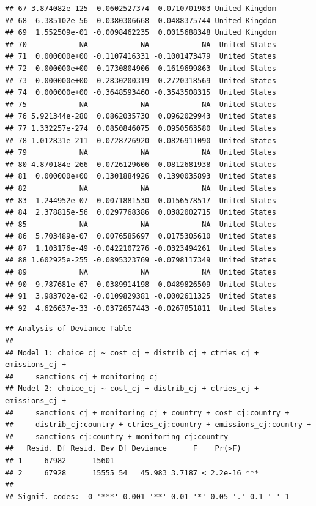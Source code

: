 \documentclass[a4paper,12pt]{article}\usepackage[]{graphicx}\usepackage[]{color}
\makeatletter
\newenvironment{kframe}{%
 \def\at@end@of@kframe{}%
 \ifinner\ifhmode%
  \def\at@end@of@kframe{\end{minipage}}%
  \begin{minipage}{\columnwidth}%
 \fi\fi%
 \def\FrameCommand##1{\hskip\@totalleftmargin \hskip-\fboxsep
 \colorbox{shadecolor}{##1}\hskip-\fboxsep
     \hskip-\linewidth \hskip-\@totalleftmargin \hskip\columnwidth}%
 \MakeFramed {\advance\hsize-\width
   \@totalleftmargin\z@ \linewidth\hsize
   \@setminipage}}%
 {\par\unskip\endMakeFramed%
 \at@end@of@kframe}
\newenvironment{knitrout}{}{} %
\makeatother
\begin{document}
\begin{knitrout}
\begin{kframe}
\begin{verbatim}
## 67 3.874082e-125  0.0602527374  0.0710701983 United Kingdom
## 68  6.385102e-56  0.0380306668  0.0488375744 United Kingdom
## 69  1.552509e-01 -0.0098462235  0.0015688348 United Kingdom
## 70            NA            NA            NA  United States
## 71  0.000000e+00 -0.1107416331 -0.1001473479  United States
## 72  0.000000e+00 -0.1730804906 -0.1619699863  United States
## 73  0.000000e+00 -0.2830200319 -0.2720318569  United States
## 74  0.000000e+00 -0.3648593460 -0.3543508315  United States
## 75            NA            NA            NA  United States
## 76 5.921344e-280  0.0862035730  0.0962029943  United States
## 77 1.332257e-274  0.0850846075  0.0950563580  United States
## 78 1.012831e-211  0.0728726920  0.0826911090  United States
## 79            NA            NA            NA  United States
## 80 4.870184e-266  0.0726129606  0.0812681938  United States
## 81  0.000000e+00  0.1301884926  0.1390035893  United States
## 82            NA            NA            NA  United States
## 83  1.244952e-07  0.0071881530  0.0156578517  United States
## 84  2.378815e-56  0.0297768386  0.0382002715  United States
## 85            NA            NA            NA  United States
## 86  5.703489e-07  0.0076585697  0.0175305610  United States
## 87  1.103176e-49 -0.0422107276 -0.0323494261  United States
## 88 1.602925e-255 -0.0895323769 -0.0798117349  United States
## 89            NA            NA            NA  United States
## 90  9.787681e-67  0.0389914198  0.0489826509  United States
## 91  3.983702e-02 -0.0109829381 -0.0002611325  United States
## 92  4.626637e-33 -0.0372657443 -0.0267851811  United States
\end{verbatim}
\end{kframe}
\end{knitrout}

\begin{knitrout}
\color{fgcolor}\begin{kframe}
\begin{verbatim}
## Analysis of Deviance Table
## 
## Model 1: choice_cj ~ cost_cj + distrib_cj + ctries_cj + emissions_cj + 
##     sanctions_cj + monitoring_cj
## Model 2: choice_cj ~ cost_cj + distrib_cj + ctries_cj + emissions_cj + 
##     sanctions_cj + monitoring_cj + country + cost_cj:country + 
##     distrib_cj:country + ctries_cj:country + emissions_cj:country + 
##     sanctions_cj:country + monitoring_cj:country
##   Resid. Df Resid. Dev Df Deviance      F    Pr(>F)    
## 1     67982      15601                                 
## 2     67928      15555 54   45.983 3.7187 < 2.2e-16 ***
## ---
## Signif. codes:  0 '***' 0.001 '**' 0.01 '*' 0.05 '.' 0.1 ' ' 1
\end{verbatim}
\end{kframe}
\end{knitrout}
\end{document}
